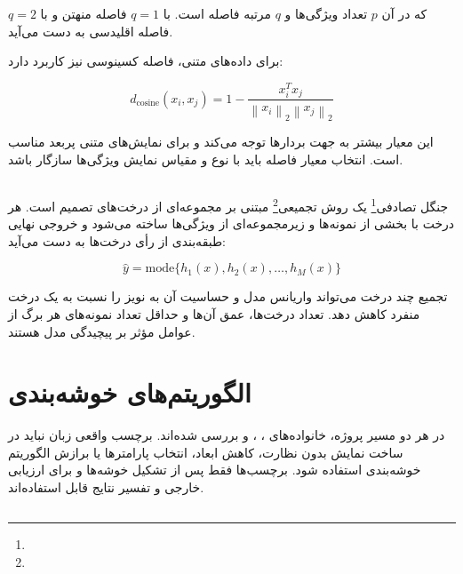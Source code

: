 که در آن $p$ تعداد ویژگی‌ها و $q$ مرتبه فاصله است. با $q=1$ فاصله منهتن و با $q=2$ فاصله اقلیدسی به دست می‌آید.

برای داده‌های متنی، فاصله کسینوسی نیز کاربرد دارد:

\begin{equation}
d_{\mathrm{cosine}}(x_i,x_j)
=
1-
\frac{x_i^Tx_j}
{\left\|x_i\right\|_2\left\|x_j\right\|_2}
\end{equation}

این معیار بیشتر به جهت بردارها توجه می‌کند و برای نمایش‌های متنی پربعد مناسب است. انتخاب معیار فاصله باید با نوع و مقیاس نمایش ویژگی‌ها سازگار باشد.


\subsection{}

جنگل تصادفی\footnote{} یک روش تجمیعی\footnote{} مبتنی بر مجموعه‌ای از درخت‌های تصمیم است. هر درخت با بخشی از نمونه‌ها و زیرمجموعه‌ای از ویژگی‌ها ساخته می‌شود و خروجی نهایی طبقه‌بندی از رأی درخت‌ها به دست می‌آید:

\begin{equation}
\hat{y}
=
\mathrm{mode}
\{h_1(x),h_2(x),\ldots,h_M(x)\}
\end{equation}

تجمیع چند درخت می‌تواند واریانس مدل و حساسیت آن به نویز را نسبت به یک درخت منفرد کاهش دهد. تعداد درخت‌ها، عمق آن‌ها و حداقل تعداد نمونه‌های هر برگ از عوامل مؤثر بر پیچیدگی مدل هستند.


\section{الگوریتم‌های خوشه‌بندی}

در هر دو مسیر پروژه، خانواده‌های
،
،
و
بررسی شده‌اند. برچسب واقعی زبان نباید در ساخت نمایش بدون نظارت، کاهش ابعاد، انتخاب پارامترها یا برازش الگوریتم خوشه‌بندی استفاده شود. برچسب‌ها فقط پس از تشکیل خوشه‌ها و برای ارزیابی خارجی و تفسیر نتایج قابل استفاده‌اند.


\subsection{}

